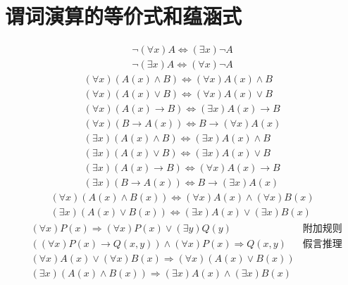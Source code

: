 \documentclass{ctexart}
\begin{document}
\section{谓词演算的等价式和蕴涵式}
\begin{align*}
\lnot(\forall x)A \Leftrightarrow (\exists x)\lnot A \\
\lnot(\exists x)A \Leftrightarrow (\forall x)\lnot A
\end{align*}
\begin{align*}
(\forall x)(A(x) \land B) \Leftrightarrow (\forall x)A(x) \land B \\
(\forall x)(A(x) \lor B) \Leftrightarrow (\forall x)A(x) \lor B \\
(\forall x)(A(x) \rightarrow B) \Leftrightarrow (\exists x)A(x) \rightarrow B \\
(\forall x)(B \rightarrow A(x)) \Leftrightarrow B \rightarrow (\forall x)A(x) \\
(\exists x)(A(x) \land B) \Leftrightarrow (\exists x)A(x) \land B \\
(\exists x)(A(x) \lor B) \Leftrightarrow (\exists x)A(x) \lor B \\
(\exists x)(A(x) \rightarrow B) \Leftrightarrow (\forall x)A(x) \rightarrow B \\
(\exists x)(B \rightarrow A(x)) \Leftrightarrow B \rightarrow (\exists x)A(x)
\end{align*}
\begin{align*}
(\forall x)(A(x) \land B(x)) \Leftrightarrow (\forall x)A(x) \land (\forall x)B(x) \\
(\exists x)(A(x) \lor B(x)) \Leftrightarrow (\exists x)A(x) \lor (\exists x)B(x)
\end{align*}
\begin{align*}
&(\forall x)P(x) \Rightarrow (\forall x)P(x) \lor (\exists y)Q(y) &\text{附加规则} \\
&((\forall x)P(x) \rightarrow Q(x, y)) \land (\forall x)P(x) \Rightarrow Q(x, y) &\text{假言推理} \\
&(\forall x)A(x) \lor (\forall x)B(x) \Rightarrow(\forall x)(A(x)\lor B(x)) \\
&(\exists x)(A(x) \land B(x)) \Rightarrow (\exists x)A(x) \land (\exists x)B(x)
\end{align*}
\end{document}
